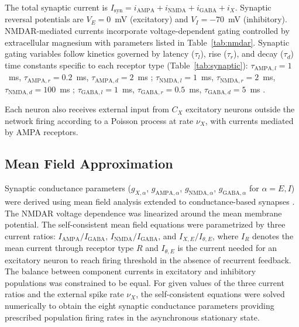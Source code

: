 \documentclass[10pt]{article}
\begin{document}
The total synaptic current is $I_{\mathrm{syn}} = i_{\mathrm{AMPA}} + i_{\mathrm{NMDA}} + i_{\mathrm{GABA}} + i_X$. Synaptic reversal potentials are $V_E = 0$~mV (excitatory) and $V_I = -70$~mV (inhibitory). NMDAR-mediated currents incorporate voltage-dependent gating controlled by extracellular magnesium \citep{jahr1990voltage} with parameters listed in Table~\ref{tab:nmdar}. Synaptic gating variables follow kinetics governed by latency ($\tau_l$), rise ($\tau_r$), and decay ($\tau_d$) time constants specific to each receptor type (Table~\ref{tab:synaptic}): $\tau_{\mathrm{AMPA},l} = 1$~ms, $\tau_{\mathrm{AMPA},r} = 0.2$~ms, $\tau_{\mathrm{AMPA},d} = 2$~ms \citep{zhou1998ampa}; $\tau_{\mathrm{NMDA},l} = 1$~ms, $\tau_{\mathrm{NMDA},r} = 2$~ms, $\tau_{\mathrm{NMDA},d} = 100$~ms \citep{hestrin1990analysis}; $\tau_{\mathrm{GABA},l} = 1$~ms, $\tau_{\mathrm{GABA},r} = 0.5$~ms, $\tau_{\mathrm{GABA},d} = 5$~ms \citep{gupta2000organizing}.

Each neuron also receives external input from $C_X$ excitatory neurons outside the network firing according to a Poisson process at rate $\nu_X$, with currents mediated by AMPA receptors.

\subsection{Mean Field Approximation}

Synaptic conductance parameters ($g_{X,\alpha}$, $g_{\mathrm{AMPA},\alpha}$, $g_{\mathrm{NMDA},\alpha}$, $g_{\mathrm{GABA},\alpha}$ for $\alpha = E, I$) were derived using mean field analysis \citep{amit1997model, brunel2000dynamics, vanvreeswijk1996chaos} extended to conductance-based synapses \citep{brunel2001effects}. The NMDAR voltage dependence was linearized around the mean membrane potential. The self-consistent mean field equations were parametrized by three current ratios: $I_{\mathrm{AMPA}}/I_{\mathrm{GABA}}$, $I_{\mathrm{NMDA}}/I_{\mathrm{GABA}}$, and $I_{X,E}/I_{\theta,E}$, where $I_R$ denotes the mean current through receptor type $R$ and $I_{\theta,E}$ is the current needed for an excitatory neuron to reach firing threshold in the absence of recurrent feedback. The balance between component currents in excitatory and inhibitory populations was constrained to be equal. For given values of the three current ratios and the external spike rate $\nu_X$, the self-consistent equations were solved numerically to obtain the eight synaptic conductance parameters providing prescribed population firing rates in the asynchronous stationary state.
\end{document}
